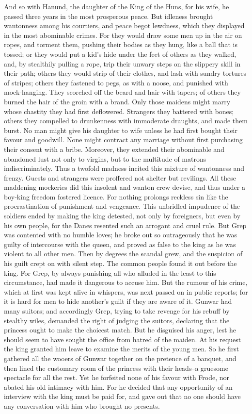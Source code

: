 \documentclass[10pt,a4paper]{report}
\begin{document}
And so with Hanund, the daughter of the King of the Huns, for his wife, he passed three years in the most prosperous peace. But idleness brought wantonness among his courtiers, and peace begot lewdness, which they displayed in the most abominable crimes. For they would draw some men up in the air on ropes, and torment them, pushing their bodies as they hung, like a ball that is tossed; or they would put a kid's hide under the feet of others as they walked, and, by stealthily pulling a rope, trip their unwary steps on the slippery skill in their path; others they would strip of their clothes, and lash with sundry tortures of stripes; others they fastened to pegs, as with a noose, and punished with mock-hanging. They scorched off the beard and hair with tapers; of others they burned the hair of the groin with a brand. Only those maidens might marry whose chastity they had first deflowered. Strangers they battered with bones; others they compelled to drunkenness with immoderate draughts, and made them burst. No man might give his daughter to wife unless he had first bought their favour and goodwill. None might contract any marriage without first purchasing their consent with a bribe. Moreover, they extended their abominable and abandoned lust not only to virgins, but to the multitude of matrons indiscriminately. Thus a twofold madness incited this mixture of wantonness and frenzy. Guests and strangers were proffered not shelter but revilings. All these maddening mockeries did this insolent and wanton crew devise, and thus under a boy-king freedom fostered licence. For nothing prolongs reckless sin like the procrastination of punishment and vengeance. This unbridled impudence of the soldiers ended by making the king detested, not only by foreigners, but even by his own people, for the Danes resented such an arrogant and cruel rule. But Grep was contented with no humble loves; he broke out so outrageously that he was guilty of intercourse with the queen, and proved as false to the king as he was violent to all other men. Then by degrees the scandal grew, and the suspicion of his guilt crept on with silent step. The common people found it out before the king. For Grep, by always punishing all who alluded in the least to this circumstance, had made it dangerous to accuse him. But the rumour of his crime, which at first was kept alive in whispers, was next passed on in public reports; for it is hard for men to hide another's guilt if they are aware of it. Gunwar had many suitors; and accordingly Grep, trying to take revenge for his rebuff by stealthy wiles, demanded the right of judging the suitors, declaring that the princess ought to make the choicest match. But he disguised his anger, lest he should seem to have sought the office from hatred of the maiden. At his request the king granted him leave to examine the merits of the young men. So he first gathered all the wooers of Gunwar together on the pretence of a banquet, and then lined the customary room of the princess with their heads--a gruesome spectacle for all the rest. Yet he forfeited none of his favour with Frode, nor abated his old intimacy with him. For he decided that any opportunity of an interview with the king must be paid for, and gave out that no one should have any conversation with him who brought no presents. 
\end{document}
